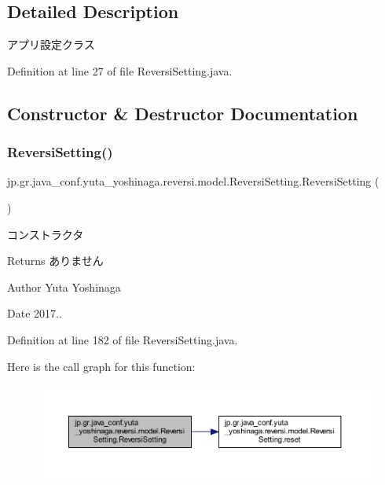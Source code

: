 \subsection{Detailed Description}
アプリ設定クラス 

Definition at line 27 of file Reversi\+Setting.\+java.



\subsection{Constructor \& Destructor Documentation}
\mbox{\label{classjp_1_1gr_1_1java__conf_1_1yuta__yoshinaga_1_1reversi_1_1model_1_1_reversi_setting_a0e2fd0216ad010dbbc9112297a6c29c4}} 
\subsubsection{\texorpdfstring{Reversi\+Setting()}{ReversiSetting()}}
{\footnotesize\ttfamily jp.\+gr.\+java\+\_\+conf.\+yuta\+\_\+yoshinaga.\+reversi.\+model.\+Reversi\+Setting.\+Reversi\+Setting (\begin{DoxyParamCaption}{ }\end{DoxyParamCaption})}



コンストラクタ 

\begin{DoxyReturn}{Returns}
ありません 
\end{DoxyReturn}
\begin{DoxyAuthor}{Author}
Yuta Yoshinaga 
\end{DoxyAuthor}
\begin{DoxyDate}{Date}
2017.. 
\end{DoxyDate}


Definition at line 182 of file Reversi\+Setting.\+java.

Here is the call graph for this function\+:\nopagebreak
\begin{figure}[H]
\begin{center}
\leavevmode
\includegraphics[width=350pt]{classjp_1_1gr_1_1java__conf_1_1yuta__yoshinaga_1_1reversi_1_1model_1_1_reversi_setting_a0e2fd0216ad010dbbc9112297a6c29c4_cgraph}
\end{center}
\end{figure}


